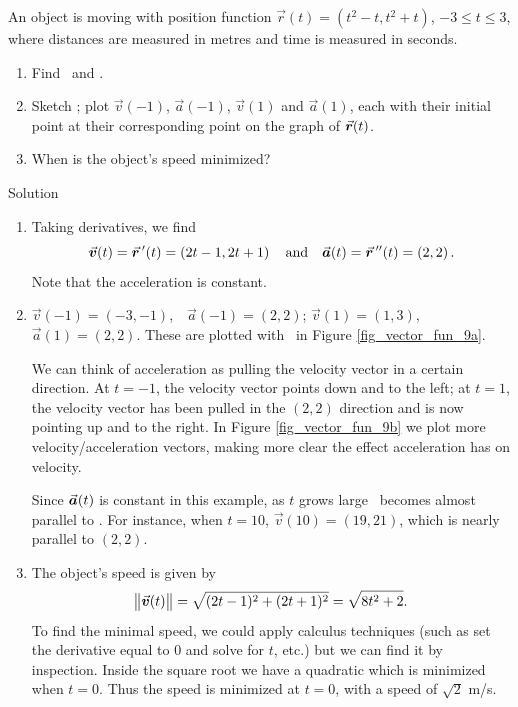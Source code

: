 \begin{example}\label{ex_motion1}
An object is moving with position function $\vec r(t) = \left( t^2-t,t^2+t\right)$, $-3\leq t\leq 3$, where distances are measured in metres and time is measured in seconds.
\begin{enumerate}
	\item Find \vvt\  and \vat.
	\item	Sketch \vrt; plot $\vec v(-1)$, $\vec a(-1)$, $\vec v(1)$ and $\vec a(1)$, each with their initial point at their corresponding point on the graph of $\vrt$.
	\item	When is the object's speed minimized?
\end{enumerate}

\ifcalculus\pagebreak\fi
{}Solution 

\begin{enumerate}
	\item Taking derivatives, we find
	$$\vvt = \vrp(t) =\left( 2t-1,2t+1\right) \quad \text{and} \quad \vat = \vrp'(t) = \left( 2,2\right).$$
	Note that the acceleration is constant.
	
	\item		$\vec v(-1) = \left( -3,-1\right)$,\ \ $\vec a(-1) = \left( 2,2\right)$; \quad $\vec v(1) = \left( 1,3\right)$,\ \ $\vec a(1) = \left( 2,2\right)$. These are plotted with \vrt\ in Figure \ref{fig_vector_fun_9a}.
	
	We can think of acceleration as pulling the velocity vector in a certain direction. At $t=-1$, the velocity vector points down and to the left; at $t=1$, the velocity vector has been pulled in the $\left( 2,2\right)$ direction and is now pointing up and to the right. In Figure \ref{fig_vector_fun_9b} we plot more velocity/acceleration vectors, making more clear the effect acceleration has on velocity.
	
	Since $\vat$ is constant in this example, as $t$ grows large \vvt\ becomes almost parallel to \vat. For instance, when $t=10$, $\vec v(10) = \left( 19,21\right)$, which is nearly parallel to $\left( 2,2\right)$.
	
	\item		The object's speed is given by 
	$$\norm{\vvt} = \sqrt{(2t-1)^2+(2t+1)^2} =\sqrt{8t^2+2}.$$ To find the minimal speed, we could apply calculus techniques (such as set the derivative equal to 0 and solve for $t$, etc.) but we can find it by inspection. Inside the square root we have a quadratic which is minimized when $t=0$. Thus the speed is minimized at $t=0$, with a speed of $\sqrt{2}$ m/s.
	

\end{enumerate}
\end{example}
